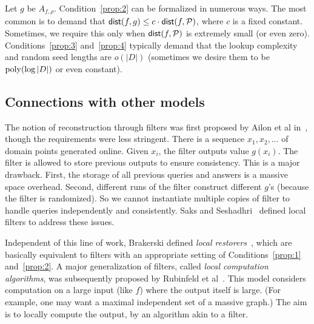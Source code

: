 \documentclass[natbib]{svcyclop}
\def\dist{{\sf dist}}
\begin{document}
Let $g$ be $A_{f,\rho}$.
Condition~\ref{prop:2} can be formalized in numerous ways. The most common is to demand that $\dist(f,g) \leq c\cdot \dist(f,\cP)$,
where $c$ is a fixed constant. Sometimes, we require this only when $\dist(f,\cP)$ is extremely small (or even zero). 
Conditions~\ref{prop:3} and~\ref{prop:4} typically demand that the lookup complexity and random
seed lengths are $o(|D|)$ (sometimes we desire them to be $\mathrm{poly}(\log |D|)$ or even constant). 


%
%


\subsection{Connections with other models}


The notion of reconstruction through filters was first proposed by Ailon et al in~\cite{ACCL2},
though the requirements were less stringent. There is a sequence $x_1, x_2, \ldots$ of domain points generated
online. Given $x_i$, the filter outputs value $g(x_i)$. 
The filter is allowed to store previous outputs to ensure consistency. This is a major drawback.
First, the storage of all previous queries and answers is a massive space overhead. Second,
different runs of the filter construct different $g$'s (because the filter is randomized).
So we cannot instantiate multiple copies of filter to handle queries independently and consistently.
Saks and Seshadhri~\cite{SS06} defined local filters to address these issues.

Independent of this line of work, Brakerski defined \emph{local restorers}~\cite{Br08}, which are basically
equivalent to filters with an appropriate setting of Conditions~\ref{prop:1} and~\ref{prop:2}.
A major generalization of filters, called \emph{local computation algorithms}, was subsequently proposed
by Rubinfeld et al~\cite{RuTaVa+11}. This model considers computation on a large input (like $f$) where the output itself
is large. (For example, one may want a maximal independent set of a massive graph.) 
The aim is to locally compute the output, by an algorithm akin to a filter.
\end{document}
